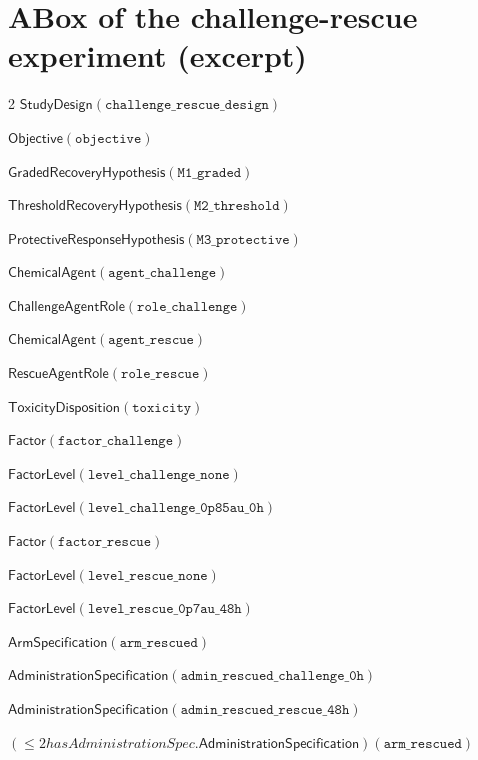 \documentclass[10pt,a4paper]{article}
\begin{document}
\section{ABox of the challenge-rescue experiment (excerpt)}
{\footnotesize\begin{multicols}{2}
$\mathsf{StudyDesign}(\mathtt{challenge\_\allowbreak{}rescue\_\allowbreak{}design})$\par
$\mathsf{Objective}(\mathtt{objective})$\par
$\mathsf{GradedRecoveryHypothesis}(\mathtt{M1\_\allowbreak{}graded})$\par
$\mathsf{ThresholdRecoveryHypothesis}(\mathtt{M2\_\allowbreak{}threshold})$\par
$\mathsf{ProtectiveResponseHypothesis}(\mathtt{M3\_\allowbreak{}protective})$\par
$\mathsf{ChemicalAgent}(\mathtt{agent\_\allowbreak{}challenge})$\par
$\mathsf{ChallengeAgentRole}(\mathtt{role\_\allowbreak{}challenge})$\par
$\mathsf{ChemicalAgent}(\mathtt{agent\_\allowbreak{}rescue})$\par
$\mathsf{RescueAgentRole}(\mathtt{role\_\allowbreak{}rescue})$\par
$\mathsf{ToxicityDisposition}(\mathtt{toxicity})$\par
$\mathsf{Factor}(\mathtt{factor\_\allowbreak{}challenge})$\par
$\mathsf{FactorLevel}(\mathtt{level\_\allowbreak{}challenge\_\allowbreak{}none})$\par
$\mathsf{FactorLevel}(\mathtt{level\_\allowbreak{}challenge\_\allowbreak{}0p85au\_\allowbreak{}0h})$\par
$\mathsf{Factor}(\mathtt{factor\_\allowbreak{}rescue})$\par
$\mathsf{FactorLevel}(\mathtt{level\_\allowbreak{}rescue\_\allowbreak{}none})$\par
$\mathsf{FactorLevel}(\mathtt{level\_\allowbreak{}rescue\_\allowbreak{}0p7au\_\allowbreak{}48h})$\par
$\mathsf{ArmSpecification}(\mathtt{arm\_\allowbreak{}rescued})$\par
$\mathsf{AdministrationSpecification}(\mathtt{admin\_\allowbreak{}rescued\_\allowbreak{}challenge\_\allowbreak{}0h})$\par
$\mathsf{AdministrationSpecification}(\mathtt{admin\_\allowbreak{}rescued\_\allowbreak{}rescue\_\allowbreak{}48h})$\par
$(≤2 \mathit{hasAdministrationSpec}.\mathsf{AdministrationSpecification})(\mathtt{arm\_\allowbreak{}rescued})$\par

\end{multicols}}
\end{document}
